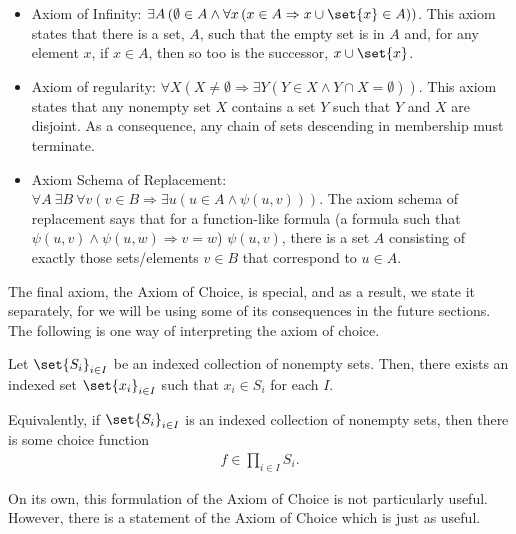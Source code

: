 \begin{definition}
\begin{itemize}
    \item Axiom of Infinity: $\exists A\left(\emptyset\in A\wedge \forall x\left(x\in A\Rightarrow x\cup\set{x}\in A\right)\right)$. This axiom states that there is a set, $A$, such that the empty set is in $A$ and, for any element $x$, if $x\in A$, then so too is the successor, $x\cup \set{x}$.
    \item Axiom of regularity: $\forall X\left(X\neq\emptyset \Rightarrow\exists Y\left(Y\in X\wedge Y\cap X = \emptyset\right)\right)$. This axiom states that any nonempty set $X$ contains a set $Y$ such that $Y$ and $X$ are disjoint. As a consequence, any chain of sets descending in membership must terminate.
    \item Axiom Schema of Replacement: $\forall A\:\exists B\:\forall v\left(v\in B\Rightarrow \exists u\left(u\in A\wedge \psi\left(u,v\right)\right)\right)$. The axiom schema of replacement says that for a function-like formula (a formula such that $\psi\left(u,v\right)\wedge \psi\left(u,w\right) \Rightarrow v=w$) $\psi\left(u,v\right)$, there is a set $A$ consisting of exactly those sets/elements $v\in B$ that correspond to $u\in A$.
  \end{itemize}
\end{definition}
The final axiom, the Axiom of Choice, is special, and as a result, we state it separately, for we will be using some of its consequences in the future sections. The following is one way of interpreting the axiom of choice.
\begin{definition}
  Let $\set{S_i}_{i\in I}$ be an indexed collection of nonempty sets. Then, there exists an indexed set $\set{x_i}_{i\in I}$ such that $x_i\in S_i$ for each $I$.\newline

  Equivalently, if $\set{S_i}_{i\in I}$ is an indexed collection of nonempty sets, then there is some choice function
  \begin{align*}
    f\in \prod_{i\in I}S_i.
  \end{align*}
\end{definition}
On its own, this formulation of the Axiom of Choice is not particularly useful. However, there is a statement of the Axiom of Choice which is just as useful.
